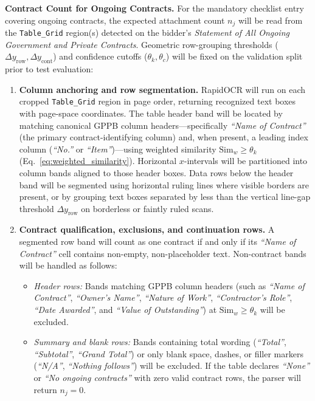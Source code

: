 \textbf{Contract Count for Ongoing Contracts.} For the mandatory checklist entry covering ongoing contracts, the expected attachment count $n_j$ will be read from the \texttt{Table\_Grid} region(s) detected on the bidder's \emph{Statement of All Ongoing Government and Private Contracts}. Geometric row-grouping thresholds ($\Delta y_{\mathrm{row}}, \Delta y_{\mathrm{cont}}$) and confidence cutoffs ($\theta_k, \theta_c$) will be fixed on the validation split prior to test evaluation:
\begin{enumerate}
    \item \textbf{Column anchoring and row segmentation.} RapidOCR will run on each cropped \texttt{Table\_Grid} region in page order, returning recognized text boxes with page-space coordinates. The table header band will be located by matching canonical GPPB column headers---specifically \emph{``Name of Contract''} (the primary contract-identifying column) and, when present, a leading index column (\emph{``No.''} or \emph{``Item''})---using weighted similarity $\mathrm{Sim}_w \ge \theta_k$ (Eq.~\eqref{eq:weighted_similarity}). Horizontal $x$-intervals will be partitioned into column bands aligned to those header boxes. Data rows below the header band will be segmented using horizontal ruling lines where visible borders are present, or by grouping text boxes separated by less than the vertical line-gap threshold $\Delta y_{\mathrm{row}}$ on borderless or faintly ruled scans.
    \item \textbf{Contract qualification, exclusions, and continuation rows.} A segmented row band will count as one contract if and only if its \emph{``Name of Contract''} cell contains non-empty, non-placeholder text. Non-contract bands will be handled as follows:
    \begin{itemize}
        \item \emph{Header rows:} Bands matching GPPB column headers (such as \emph{``Name of Contract''}, \emph{``Owner's Name''}, \emph{``Nature of Work''}, \emph{``Contractor's Role''}, \emph{``Date Awarded''}, and \emph{``Value of Outstanding''}) at $\mathrm{Sim}_w \ge \theta_k$ will be excluded.
        \item \emph{Summary and blank rows:} Bands containing total wording (\emph{``Total''}, \emph{``Subtotal''}, \emph{``Grand Total''}) or only blank space, dashes, or filler markers (\emph{``N/A''}, \emph{``Nothing follows''}) will be excluded. If the table declares \emph{``None''} or \emph{``No ongoing contracts''} with zero valid contract rows, the parser will return $n_j = 0$.

\end{itemize}
\end{enumerate}
